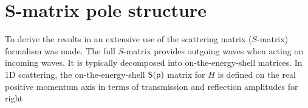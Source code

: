 %
%
%

%
\section{S-matrix pole structure}
\label{sec:SPoles}
%
%
%
To derive the results in \cite{Ruschhaupt2017} an extensive use of the scattering matrix ($S$-matrix) formalism was made. The full $S$-matrix
provides outgoing waves when acting on incoming waves. It is typically decomposed into on-the-energy-shell matrices.
In 1D scattering, the on-the-energy-shell $\sf{S}(p)$ matrix for $H$ is defined on the real positive momentum axis in terms of transmission and reflection amplitudes for right
